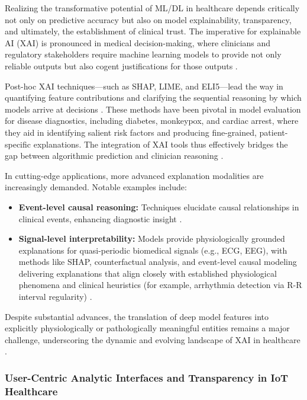 \documentclass[sigconf]{acmart}
\begin{document}
Realizing the transformative potential of ML/DL in healthcare depends critically not only on predictive accuracy but also on model explainability, transparency, and ultimately, the establishment of clinical trust. The imperative for explainable AI (XAI) is pronounced in medical decision-making, where clinicians and regulatory stakeholders require machine learning models to provide not only reliable outputs but also cogent justifications for those outputs \cite{ref11,ref39,ref50,ref65,ref80}.

Post-hoc XAI techniques—such as SHAP, LIME, and ELI5—lead the way in quantifying feature contributions and clarifying the sequential reasoning by which models arrive at decisions \cite{ref11,ref28,ref36,ref50,ref65}. These methods have been pivotal in model evaluation for disease diagnostics, including diabetes, monkeypox, and cardiac arrest, where they aid in identifying salient risk factors and producing fine-grained, patient-specific explanations. The integration of XAI tools thus effectively bridges the gap between algorithmic prediction and clinician reasoning \cite{ref11,ref28,ref32,ref36,ref39,ref50,ref65,ref98}.

In cutting-edge applications, more advanced explanation modalities are increasingly demanded. Notable examples include:
\begin{itemize}
    \item \textbf{Event-level causal reasoning:} Techniques elucidate causal relationships in clinical events, enhancing diagnostic insight \cite{ref36,ref39}.
    \item \textbf{Signal-level interpretability:} Models provide physiologically grounded explanations for quasi-periodic biomedical signals (e.g., ECG, EEG), with methods like SHAP, counterfactual analysis, and event-level causal modeling delivering explanations that align closely with established physiological phenomena and clinical heuristics (for example, arrhythmia detection via R-R interval regularity) \cite{ref36,ref68,ref39,ref98,ref99}.
\end{itemize}
Despite substantial advances, the translation of deep model features into explicitly physiologically or pathologically meaningful entities remains a major challenge, underscoring the dynamic and evolving landscape of XAI in healthcare \cite{ref98,ref99}.

\subsubsection{User-Centric Analytic Interfaces and Transparency in IoT Healthcare}
\end{document}
